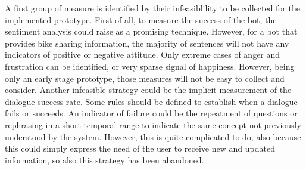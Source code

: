 A first group of measure is identified by their infeasiblility to be collected for the implemented prototype. First of all, to measure the success of the bot, the sentiment analysis could raise as a promising technique. However, for a bot that provides bike sharing information, the majority of sentences will not have any indicators of positive or negative attitude. Only extreme cases of anger and frustration can be identified, or very sparse signal of happiness. However, being only an early stage prototype, those measures will not be easy to collect and consider. Another infeasible strategy could be the implicit measurement of the dialogue success rate. Some rules should be defined to establish when a dialogue fails or succeeds. An indicator of failure could be the repeatment of questions or rephrasing in a short temporal range to indicate the same concept not previously understood by the system. However, this is quite complicated to do, also because this could simply express the need of the user to receive new and updated information, so also this strategy has been abandoned.


